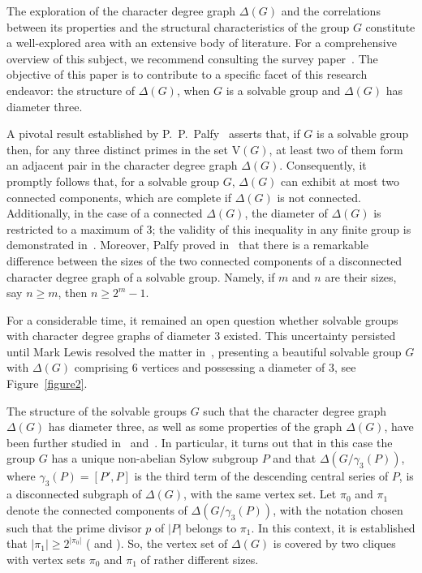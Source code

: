 \documentclass{amsart}
\def\V#1{\mathrm{V}(#1)}
\begin{document}
The exploration of the character degree graph $\Delta(G)$ and the correlations between its properties and the structural characteristics of the group $G$ constitute a well-explored area with an extensive body of literature. For a comprehensive overview of this subject, we recommend consulting the survey paper~\cite{lewis2}. The objective of this paper is to contribute to a specific facet of this research endeavor: the structure of $\Delta(G)$, when $G$ is a solvable group and  $\Delta(G)$ has diameter three.

A pivotal result established by P.~P.~Palfy~\cite{palfy1} asserts that, if $G$ is a solvable group then, for any three distinct primes in the set $\V G$, at least two of them form an adjacent pair in the character degree graph $\Delta(G)$. Consequently, it promptly follows that, for a solvable group $G$, $\Delta(G)$ can exhibit at most two connected components, which are complete if $\Delta(G)$ is not connected. Additionally, in the case of a connected $\Delta(G)$, the diameter of $\Delta(G)$ is restricted to a maximum of $3$; the validity of this inequality in any finite group is demonstrated in~\cite{lewis3}.
Moreover, Palfy proved in~\cite{palfy2} that there is a remarkable difference between the sizes of the two connected components
of a disconnected  character degree graph of a solvable group. Namely,  if $m$ and $n$ are their sizes,  say $n \geq m$, then  $n \geq 2^m -1$.

For a considerable time, it remained an open question whether solvable groups with character degree graphs of diameter $3$ existed. This uncertainty persisted until Mark Lewis resolved the matter in~\cite{lewis1}, presenting a beautiful solvable group $G$ with $\Delta(G)$ comprising $6$ vertices and possessing a diameter of $3$, see Figure~\ref{figure2}.

The structure of the solvable groups $G$ such that the character degree graph $\Delta(G)$ has diameter three, as well as some
properties of the graph $\Delta(G)$, have been further studied in~\cite{CDPS} and~\cite{sass}.
In particular, it turns out that in this case the group $G$ has a unique non-abelian Sylow subgroup $P$ and that $\Delta(G/\gamma_3(P))$,
where $\gamma_3(P) = [P', P]$ is the third term of the descending central series of $P$, is a disconnected subgraph of $\Delta(G)$,
with the same vertex set. Let $\pi_0$ and $\pi_1$ denote the connected components of $\Delta(G/\gamma_3(P))$, with the notation chosen such that the prime divisor $p$ of $|P|$ belongs to $\pi_1$. In this context, it is established that $|\pi_1| \geq 2^{|\pi_0|}$ (\cite[Remark 4.4]{CDPS} and \cite[Theorem 4]{sass}).
So, the vertex set of  $\Delta(G)$ is covered by two cliques with vertex sets $\pi_0$ and $\pi_1$ of rather different sizes.
\end{document}
